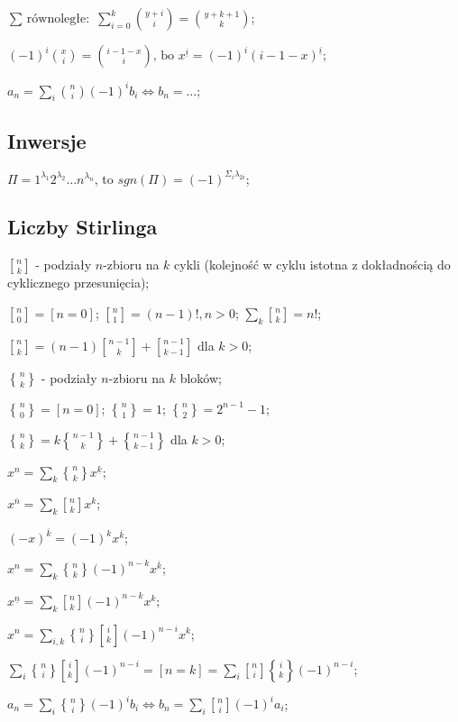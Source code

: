 \documentclass[10pt,a4paper,twocolumn]{article}
\begin{document}
$\text{$\sum$ równoległe: } \sum^k_{i=0} \binom{y + i}{i} =
  \binom{y + k + 1}{k}$;

$(-1)^i\binom{x}{i} = \binom{i - 1 - x}{i} \text{, bo }  x^{\underline{i}} =
  (-1)^i(i - 1 - x)^{\underline{i}}$;

$a_n = \sum_i\binom{n}{i}(-1)^i b_i \iff b_n = \dots$;

\subsection{Inwersje}

$\Pi = 1^{\lambda_1}2^{\lambda_2}\dots n^{\lambda_n}$, to $sgn(\Pi) =
  (-1)^{\Sigma_i\lambda_{2i}}$;

\subsection{Liczby Stirlinga}

${n \brack k}$ - podziały $n$-zbioru na $k$ cykli (kolejność w cyklu istotna z
  dokładnością do cyklicznego przesunięcia);

${n \brack 0} = [ n = 0 ]$;
${n \brack 1} = (n - 1)!, n > 0$;
$\sum_k{n \brack k} = n!$;

${n \brack k} = (n-1){n-1 \brack k}+{n-1 \brack k-1}$ dla ${k > 0}$;

${n \brace k}$ - podziały $n$-zbioru na $k$ bloków;

${n \brace 0} = [n = 0]$;
${n \brace 1} = 1$;
${n \brace 2} = 2^{n-1}-1$;

${n \brace k} = k{n-1 \brace k} + {n-1 \brace k-1}$ dla ${k > 0}$;

$x^n = \sum_k{n \brace k} x^{\underline{k}}$;

$x^{\overline{n}} = \sum_k{n \brack k}x^k$;

$(-x)^{\overline{k}} = (-1)^kx^{\overline{k}}$;

$x^n = \sum_k {n \brace k} (-1)^{n-k} x^{\overline{k}}$;

$x^{\underline{n}} = \sum_k {n \brack k} (-1)^{n-k} x^{k}$;

$x^n = \sum_{i,k} {n \brace i}{i \brack k}(-1)^{n-i}x^k$;

$\sum_i{n \brace i}{i \brack k}(-1)^{n-i} = [n=k] =
  \sum_i{n \brack i}{i \brace k}(-1)^{n-i}$;

$a_n = \sum_i{n \brace i}(-1)^ib_i \iff b_n = \sum_i{n \brack i}(-1)^ia_i$;
\end{document}
